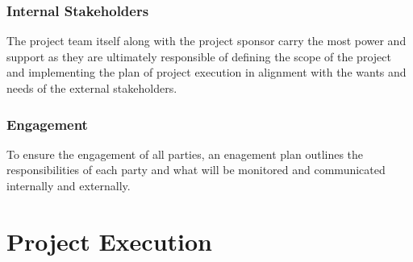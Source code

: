 \documentclass[english,course]{lecture}
\begin{document}
\subsubsection*{Internal Stakeholders}
The project team itself along with the project sponsor carry the most power and support as they are ultimately responsible of defining the scope of the project and implementing the plan of project execution in alignment with the wants and needs of the external stakeholders.
%
\subsubsection*{Engagement}
To ensure the engagement of all parties, an enagement plan outlines the responsibilities of each party and what will be monitored and communicated internally and externally.
%
\section{Project Execution}
\end{document}
